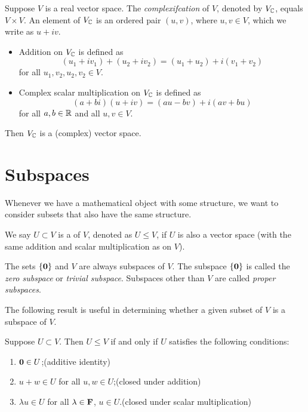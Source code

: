 \begin{example}[Complexification]
Suppose $V$ is a real vector space. The \emph{complexifcation} of $V$, denoted by $V_\mathbb C$, equals $V\times V$. An element of $V_\mathbb C$ is an ordered pair $(u,v)$, where $u,v\in V$, which we write as $u+iv$.
\begin{itemize}
\item Addition on $V_\mathbb C$ is defined as
\[(u_1+iv_1)+(u_2+iv_2)=(u_1+u_2)+i(v_1+v_2)\]
for all $u_1,v_2,u_2,v_2\in V$.
\item Complex scalar multiplication on $V_\mathbb C$ is defined as
\[(a+bi)(u+iv)=(au-bv)+i(av+bu)\]
for all $a,b\in\mathbb R$ and all $u,v\in V$.
\end{itemize}
Then $V_\mathbb C$ is a (complex) vector space.
\end{example}
\pagebreak

\section{Subspaces}
Whenever we have a mathematical object with some structure, we want to consider subsets that also have the same structure.

\begin{definition}[Subspace]
We say $U\subset V$ is a  of $V$, denoted as $U\le V$, if $U$ is also a vector space (with the same addition and scalar multiplication as on $V$).
\end{definition}

The sets $\{\vb{0}\}$ and $V$ are always subspaces of $V$. The subspace $\{\vb{0}\}$ is called the \emph{zero subspace} or \emph{trivial subspace}. Subspaces other than $V$ are called \emph{proper subspaces}.

The following result is useful in determining whether a given subset of $V$ is a subspace of $V$.

\begin{lemma}\label{lemma:subspace-test}
Suppose $U\subset V$. Then $U\le V$ if and only if $U$ satisfies the following conditions:
\begin{enumerate}[label=(\roman*)]
\item $\vb{0}\in U$;\hfill(additive identity)
\item $u+w\in U$ for all $u,w\in U$;\hfill(closed under addition)
\item $\lambda u\in U$ for all $\lambda\in\mathbf F$, $u\in U$.\hfill(closed under scalar multiplication)
\end{enumerate}
\end{lemma}

